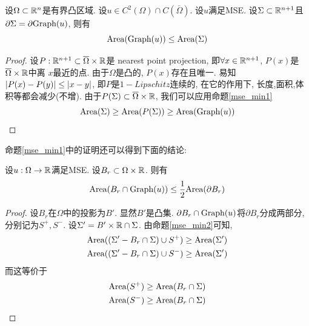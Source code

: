 \begin{proposition}\label{mse_min2}
    设$\Omega \subset \mathbb{R}^n$是有界凸区域. 设$u \in C^2(\Omega) \cap C(\overline{\Omega})$. 设$u$满足MSE. 设$\Sigma\subset \mathbb{R}^{n+1}$且$\partial \Sigma = \partial \text{Graph}(u)$, 则有
    \begin{equation}
        \text{Area}(\text{Graph}(u)) \le \text{Area}(\Sigma)
    \end{equation}
\end{proposition}
\begin{proof}
    设$P:\mathbb{R}^{n+1} \subset \overline{\Omega} \times \mathbb{R}$是 nearest point projection, 即$\forall x \in \mathbb{R}^{n+1}$, $P(x)$是$\overline{\Omega}\times \mathbb{R}$中离 $x$最近的点. 由于$\Omega$是凸的, $P(x)$存在且唯一. 易知$\left | P(x)-P(y) \right | \le \left | x-y \right |$, 即$P$是$1-Lipschitz$连续的, 在它的作用下, 长度,面积,体积等都会减少(不增). 由于$P(\Sigma) \subset \overline{\Omega} \times \mathbb{R}$, 我们可以应用命题\eqref{mse_min1}
    \begin{equation}
        \text{Area}(\Sigma) \ge \text{Area}(P(\Sigma)) \ge \text{Area}(\text{Graph}(u))
    \end{equation}
\end{proof}
命题\eqref{mse_min1}中的证明还可以得到下面的结论:
\begin{corollary}
    设$u: \Omega \to \mathbb{R}$满足MSE. 设$B_r \subset \Omega \times \mathbb{R}$. 则有
    \begin{equation}
        \text{Area}(B_r \cap \text{Graph}(u)) \le \frac{1}{2} \text{Area}(\partial B_r)
    \end{equation}
\end{corollary}
\begin{proof}
    设$B_r$在$\Omega$中的投影为$B'$. 显然$B'$是凸集. $\partial B_r \cap \text{Graph}(u)$将$\partial B_r$分成两部分, 分别记为$S^+, S^-$. 设$\Sigma'= B'\times \mathbb{R} \cap \Sigma$. 由命题\eqref{mse_min2}可知, 
    \begin{align}
        &\text{Area}((\Sigma'-B_r \cap \Sigma) \cup S^+) \ge \text{Area}(\Sigma') \\
        &\text{Area}((\Sigma'-B_r \cap \Sigma) \cup S^-) \ge \text{Area}(\Sigma')
    \end{align}
    而这等价于
    \begin{align}
        &\text{Area}(S^+) \ge \text{Area}(B_r \cap \Sigma)  \\
        &\text{Area}(S^-) \ge \text{Area}(B_r \cap \Sigma) 
    \end{align}
\end{proof}
